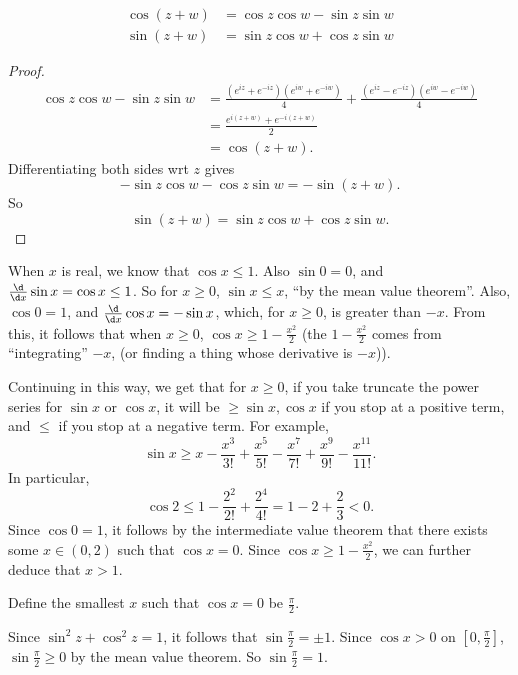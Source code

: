 \documentclass[a4paper]{article}
\begin{document}
\begin{prop}
  \begin{align*}
    \cos(z + w) &= \cos z\cos w - \sin z\sin w\\
    \sin(z + w) &= \sin z \cos w + \cos z \sin w
  \end{align*}
\end{prop}

\begin{proof}
  \begin{align*}
    \cos z\cos w - \sin z \sin w &= \frac{(e^{iz} + e^{-iz})(e^{iw} + e^{-iw})}{4} + \frac{(e^{iz} - e^{-iz})(e^{iw} - e^{-iw})}{4}\\
    &= \frac{e^{i(z + w)} + e^{-i(z + w)}}{2}\\
    &= \cos (z + w).
  \end{align*}
  Differentiating both sides wrt $z$ gives
  \[
    -\sin z \cos w - \cos z \sin w = -\sin (z + w).
  \]
  So
  \[
    \sin(z + w) = \sin z\cos w + \cos z \sin w.
  \]
\end{proof}
When $x$ is real, we know that $\cos x \leq 1$. Also $\sin 0 = 0$, and $\frac{\d }{\d x}\sin x = \cos x \leq 1$. So for $x \geq 0$, $\sin x \leq x$, ``by the mean value theorem''. Also, $\cos 0 = 1$, and $\frac{\d}{\d x}\cos x = -\sin x$, which, for $x \geq 0$, is greater than $-x$. From this, it follows that when $x \geq 0$, $\cos x \geq 1 - \frac{x^2}{2}$ (the $1 - \frac{x^2}{2}$ comes from ``integrating'' $-x$, (or finding a thing whose derivative is $-x$)).

Continuing in this way, we get that for $x \geq 0$, if you take truncate the power series for $\sin x$ or $\cos x$, it will be $\geq \sin x, \cos x$ if you stop at a positive term, and $\leq$ if you stop at a negative term. For example,
\[
  \sin x \geq x - \frac{x^3}{3!} + \frac{x^5}{5!} - \frac{x^7}{7!} + \frac{x^9}{9!} - \frac{x^{11}}{11!}.
\]
In particular,
\[
  \cos 2 \leq 1 - \frac{2^2}{2!} + \frac{2^4}{4!} = 1 - 2 + \frac{2}{3} < 0.
\]
Since $\cos 0 = 1$, it follows by the intermediate value theorem that there exists some $x\in (0, 2)$ such that $\cos x = 0$. Since $\cos x \geq 1 - \frac{x^2}{2}$, we can further deduce that $x > 1$.

\begin{defi}[Pi]
  Define the smallest $x$ such that $\cos x = 0$ be $\frac{\pi}{2}$.
\end{defi}

Since $\sin^2 z + \cos ^2 z = 1$, it follows that $\sin \frac{\pi}{2} = \pm 1$. Since $\cos x > 0$ on $[0, \frac{\pi}{2}]$, $\sin \frac{\pi}{2} \geq 0$ by the mean value theorem. So $\sin \frac{\pi}{2} = 1$.
\end{document}
